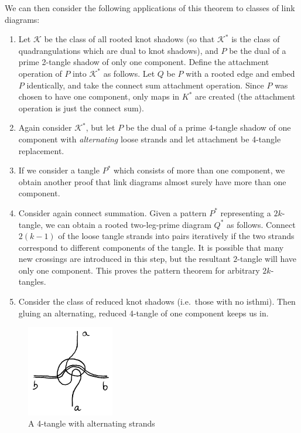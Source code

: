 \documentclass[amsmath,longbibliography,secnumarabic,floatfix,amssymb,nofootinbib,nobibnotes,letterpaper,11pt,notitlepage,tightenlines]{revtex4-1}
\newcommand{\FlatKnotDia}{\mathscr{K}}
\newcommand{\KnotShad}{\FlatKnotDia}
\begin{document}
We can then consider the following applications of this theorem to classes of link diagrams:
\begin{enumerate}
\item Let $\KnotShad$ be the class of all rooted knot shadows (so that $\KnotShad^*$ is the class of
  quadrangulations which are dual to knot shadows), and $P$ be the dual of a prime 2-tangle shadow
  of only one component. Define the attachment operation of $P$ into $\KnotShad^*$ as follows. Let
  $Q$ be $P$ with a rooted edge and embed $P$ identically, and take the connect sum attachment
  operation. Since $P$ was chosen to have one component, only maps in $K^*$ are created (the
  attachment operation is just the connect sum).
\item Again consider $\KnotShad^*$, but let $P$ be the dual of a prime 4-tangle shadow of one
  component with \emph{alternating} loose strands and let attachment be 4-tangle replacement.
\item If we consider a tangle $P^*$ which consists of more than one component, we obtain another
  proof that link diagrams almost surely have more than one component.
\item Consider again connect summation. Given a pattern $P^*$ representing a $2k$-tangle, we can
  obtain a rooted two-leg-prime diagram $Q^*$ as follows. Connect $2(k-1)$ of the loose tangle
  strands into pairs iteratively if the two strands correspond to different components of the
  tangle. It is possible that many new crossings are introduced in this step, but the resultant
  $2$-tangle will have only one component. This proves the pattern theorem for arbitrary
  $2k$-tangles.
\item Consider the class of reduced knot shadows (i.e.\ those with no isthmi). Then gluing an
  alternating, reduced 4-tangle of one component keeps us in.
\end{enumerate}

\begin{figure}[h!]  \centering
  \includegraphics[width=1.5in]{alt_4_tangle}
  \caption{A 4-tangle with alternating strands}
  \label{fig:alt4tangle}
\end{figure}
\end{document}
